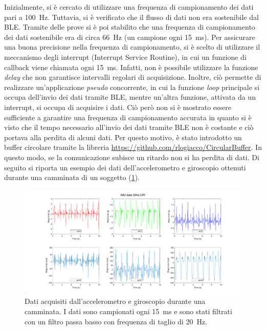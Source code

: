Inizialmente, si è cercato di utilizzare una frequenza di campionamento dei dati pari a \SI{100}{\hertz}. Tuttavia, si è verificato che il flusso di dati non era sostenibile dal BLE. Tramite delle prove si è poi stabilito che una frequenza di campionamento dei dati sostenibile era di circa \SI{66}{\hertz} (un campione ogni \SI{15}{\milli\second}). Per assicurare una buona precisione nella frequenza di campionamento, si è scelto di utilizzare il meccanismo degli interrupt (Interrupt Service Routine), in cui un funzione di callback viene chiamata ogni \SI{15}{\milli\second}. Infatti, non è possibile utilizzare la funzione \textit{delay} che non garantisce intervalli regolari di acquisizione. Inoltre, ciò permette di realizzare un'applicazione \textit{pseudo} concorrente, in cui la funzione \textit{loop} principale si occupa dell'invio dei dati tramite BLE, mentre un'altra funzione, attivata da un interrupt, si occupa di acquisire i dati. Ciò però non si è mostrato essere sufficiente a garantire una frequenza di campionamento accurata in quanto si è visto che il tempo necessario all'invio dei dati tramite BLE non è costante e ciò portava alla perdita di alcuni dati.
Per questo motivo, è stato introdotto un buffer circolare tramite la libreria \url{https://github.com/rlogiacco/CircularBuffer}. In questo modo, se la comunicazione subisce un ritardo non si ha perdita di dati. Di seguito si riporta un esempio dei dati dell'accelerometro e giroscopio ottenuti durante una camminata di un soggetto (\Fig\ref{fig:imu_data}).
\begin{figure}[tbh]
	\centering
	\includegraphics[width=1\linewidth]{./ImageFiles/IMU_data_example.pdf}
	\caption{Dati acquisiti dall'accelerometro e giroscopio durante una camminata. I dati sono campionati ogni \SI{15}{\milli\second} e sono stati filtrati con un filtro passa basso con frequenza di taglio di \SI{20}{\hertz}.}
	\label{fig:imu_data}
\end{figure}

